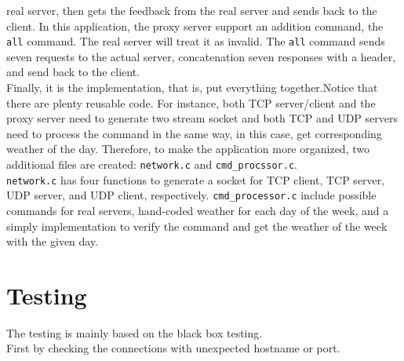 \documentclass[12pt]{article}
\begin{document}
real server, then gets the feedback from the real server and sends back to the 
client. In this application, the proxy server support an addition command, the 
\texttt{all} command. The real server will treat it as invalid. The \texttt{all}
command sends seven requests to the actual server, concatenation seven responses
with a header, and send back to the client. 
\\[0.5cm]
Finally, it is the implementation, that is, put everything together.Notice that 
there are plenty reusable code. For instance, both TCP server/client and the proxy 
server need to generate two stream socket and both TCP and UDP servers need to 
process the command in the same way, in this case, get corresponding weather of 
the day. Therefore, to make the application more organized, two additional files 
are created:  \texttt{network.c} and \texttt{cmd\_procssor.c}. 
\\[0.5cm]
\texttt{network.c} has four functions to generate a socket for TCP client, TCP 
server, UDP server, and UDP client, respectively. \texttt{cmd\_processor.c} 
include possible commands for real servers, hand-coded weather for each 
day of the week, and a simply implementation to verify the command and get the
weather of the week with the given day. 

\section*{Testing}
The testing is mainly based on the black box testing. 
\\[0.5cm]
First by checking the connections with unexpected hostname or port. 
\end{document}
